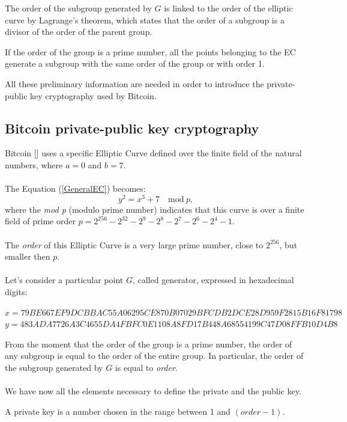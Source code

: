 \begin{remark}
	The order of the subgroup generated by $G$ is linked to the order of the elliptic curve by Lagrange's theorem, which states that the order of a subgroup is a divisor of the order of the parent group.
\end{remark}

\begin{remark}
	If the order of the group is a prime number, all the points belonging to the EC generate a subgroup with the same order of the group or with order 1.
\end{remark}
All these preliminary information are needed in order to introduce the private-public key cryptography used by Bitcoin.





\subsection{Bitcoin private-public key cryptography}

Bitcoin [\cite{11}] uses a specific Elliptic Curve defined over the finite field of the natural numbers, where $a=0$ and $b=7$.\\ \\
The Equation (\ref{GeneralEC}) becomes:
\begin{equation}\label{BitcoinEC}
y^2=x^3+7 \quad \textrm{mod} \ p,
\end{equation}
where the \textit{mod p} (modulo prime number) indicates that this curve is over a finite field of prime order $p=2^{256}-2^{32}-2^9-2^8-2^7-2^6-2^4-1$.
\\ \\
The \textit{order} of this Elliptic Curve is a very large prime number, close to $2^{256}$, but smaller then $p$. \\ \\
Let's consider a particular point $G$, called generator, expressed in hexadecimal digits:
\begin{center} 
	$ x=79BE667E F9DCBBAC 55A06295 CE870B07 029BFCDB 2DCE28D9 59F2815B 16F81798$\\
	$y=483ADA77 26A3C465 5DA4FBFC 0E1108A8 FD17B448 A6855419 9C47D08F FB10D4B8$
\end{center}
From the moment that the order of the group is a prime number, the order of any subgroup is equal to the order of the entire group. In particular, the order of the subgroup generated by $G$ is equal to \textit{order}.
\\ \\
We have now all the elements necessary to define the private and the public key.
\begin{definition}
	A private key is a number chosen in the range between 1 and $(order-1)$.
\end{definition}

